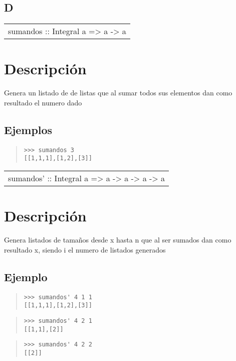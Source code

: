 \subsection{D}
\begin{haddockdesc}
\item[\begin{tabular}{@{}l}
sumandos :: Integral a => a -> {\char 91}{\char 91}a{\char 93}{\char 93}
\end{tabular}]
{\haddockbegindoc
\section*{Descripción}
Genera un listado de de listas que al sumar todos sus elementos dan como resultado el numero dado\par
\subsection*{Ejemplos}
\begin{quote}
{\haddockverb\begin{verbatim}
>>> sumandos 3
[[1,1,1],[1,2],[3]]

\end{verbatim}}
\end{quote}}
\end{haddockdesc}
\begin{haddockdesc}
\item[\begin{tabular}{@{}l}
sumandos' :: Integral a => a -> a -> a -> {\char 91}{\char 91}a{\char 93}{\char 93}
\end{tabular}]
{\haddockbegindoc
\section*{Descripción}
Genera listados de tamaños desde x hasta n que al ser sumados dan como resultado x, siendo i el numero de listados generados\par
\subsection*{Ejemplo}
\begin{quote}
{\haddockverb\begin{verbatim}
>>> sumandos' 4 1 1
[[1,1,1],[1,2],[3]]

\end{verbatim}}
\end{quote}
\begin{quote}
{\haddockverb\begin{verbatim}
>>> sumandos' 4 2 1
[[1,1],[2]]

\end{verbatim}}
\end{quote}
\begin{quote}
{\haddockverb\begin{verbatim}
>>> sumandos' 4 2 2
[[2]]

\end{verbatim}}
\end{quote}}
\end{haddockdesc}